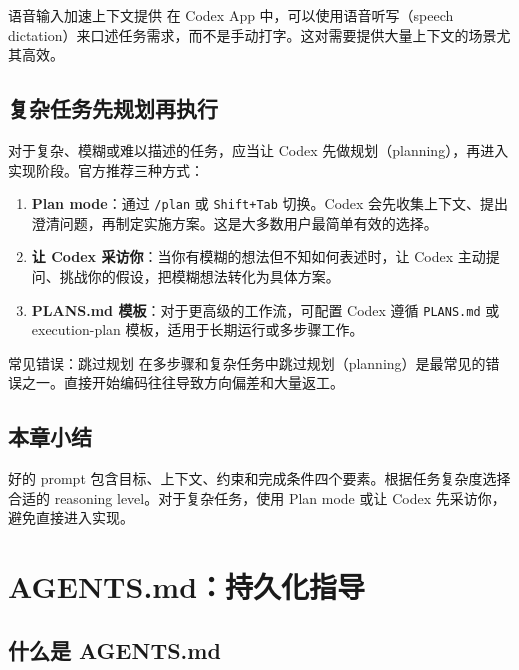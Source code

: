 \documentclass[a4paper]{article}
\begin{document}
\begin{knowledgebox}{语音输入加速上下文提供}
在 Codex App 中，可以使用语音听写（speech dictation）来口述任务需求，而不是手动打字。这对需要提供大量上下文的场景尤其高效。
\end{knowledgebox}

\subsection{复杂任务先规划再执行}

对于复杂、模糊或难以描述的任务，应当让 Codex 先做规划（planning），再进入实现阶段。官方推荐三种方式：

\begin{enumerate}
    \item \textbf{Plan mode}：通过 \texttt{/plan} 或 \texttt{Shift+Tab} 切换。Codex 会先收集上下文、提出澄清问题，再制定实施方案。这是大多数用户最简单有效的选择。
    \item \textbf{让 Codex 采访你}：当你有模糊的想法但不知如何表述时，让 Codex 主动提问、挑战你的假设，把模糊想法转化为具体方案。
    \item \textbf{PLANS.md 模板}：对于更高级的工作流，可配置 Codex 遵循 \texttt{PLANS.md} 或 execution-plan 模板，适用于长期运行或多步骤工作。
\end{enumerate}

\begin{warningbox}{常见错误：跳过规划}
在多步骤和复杂任务中跳过规划（planning）是最常见的错误之一。直接开始编码往往导致方向偏差和大量返工。
\end{warningbox}

\subsection{本章小结}

好的 prompt 包含目标、上下文、约束和完成条件四个要素。根据任务复杂度选择合适的 reasoning level。对于复杂任务，使用 Plan mode 或让 Codex 先采访你，避免直接进入实现。

\section{AGENTS.md：持久化指导}

\subsection{什么是 AGENTS.md}
\end{document}
